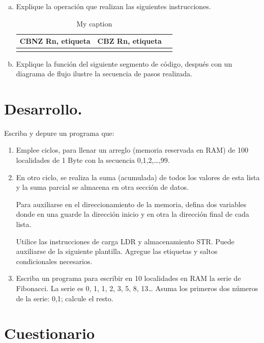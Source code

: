 \documentclass[a4paper,11pt]{article}                 %
\begin{document}
\begin{enumerate}[a)]
  	\item Explique la operación que realizan las siguientes instrucciones.  
  	
  	\begin{table}[H]
  		\begin{tabular}{|l |l|l|}
  			\hline
  			CBNZ Rn, etiqueta  & CBZ Rn, etiqueta  \\ \hline
  			         &                             \\ \hline
  		\end{tabular}
  		\centering
  		\caption{My caption}
  		\label{my-label}
  	\end{table}
  	
  	\item Explique la función del siguiente segmento de código, después con un diagrama de flujo ilustre la secuencia de pasos realizada. 
  	
  \end{enumerate}
 \section{Desarrollo.}
 Escriba y depure un programa que: 
 
 \begin{enumerate}
 	\item Emplee ciclos, para llenar un arreglo (memoria reservada en RAM) de 100 localidades de 1 Byte con la secuencia 0,1,2,…,99. 
 	\item En otro ciclo, se realiza la suma (acumulada) de todos los valores de esta lista y la suma parcial se almacena en otra sección de datos.
 	
 	Para auxiliarse en el direccionamiento de la memoria, defina dos variables donde en una guarde la dirección inicio y en otra la dirección final de cada lista. 
 	
 	Utilice las instrucciones de carga LDR y almacenamiento STR. Puede auxiliarse de la siguiente plantilla. Agregue las etiquetas y saltos condicionales necesarios.
 	
 	\item  Escriba un programa para escribir en 10 localidades en RAM la serie de Fibonacci. La serie es 0, 1, 1, 2, 3, 5, 8, 13… Asuma los primeros dos números de la serie: 0,1; calcule el resto. 
 \end{enumerate}
  
  \section{Cuestionario}
  
\end{document}
